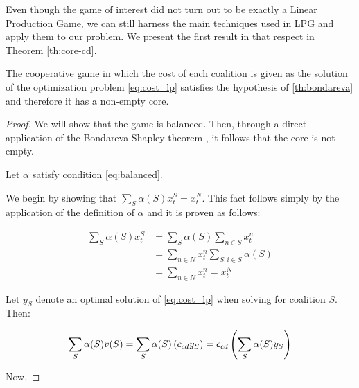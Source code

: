 Even though the game of interest did not turn out to be exactly a Linear Production Game, we can still harness the main techniques used in LPG and apply them to our problem. We present the first result in that respect in Theorem \ref{th:core-cd}.

\begin{theorem}\label{th:core-cd}
  The cooperative game in which the cost of each coalition is given as the solution of the optimization problem \eqref{eq:cost_lp} satisfies the hypothesis of \ref{th:bondareva} and therefore it has a non-empty core.
\end{theorem}

\begin{proof}
We will show that the game is balanced. Then, through a direct application of the Bondareva-Shapley theorem \cite{Shapley1971}, it follows that the core is not empty.


Let $\alpha$ satisfy condition \eqref{eq:balanced}.

We begin by showing that $ \sum_S \alpha(S) x^S_t = x^N_t$. This fact follows simply by the application of the definition of $\alpha$ and it is proven as follows:
 

\begin{equation}\label{eq:rhs_core_deter}
    \begin{aligned}
        \sum_S \alpha(S) x^S_t & = \sum_S \alpha(S) \sum_{n \in S}x^n_t \\ &= \sum_{n \in N}x^n_t\sum_{S \colon i \in S} \alpha(S) \\ &= \sum_{n \in N} x^n_t = x^N_t
    \end{aligned}
 \end{equation}

Let $y_S$ denote an optimal solution of \eqref{eq:cost_lp} when solving for coalition $S$. Then:

\begin{equation}
    \sum_{S} \alpha(S) v(S) = \sum_{S} \alpha(S) \left(c_{cd} y_S\right) = c_{cd} \left(\sum_S \alpha(S) y_S \right)
\end{equation}

Now,


\end{proof}
